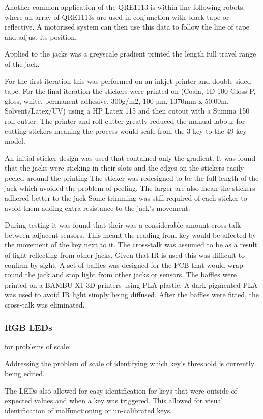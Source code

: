 Another common application of the QRE1113 is within line following
robots, where an array of QRE1113s are used in conjunction with black
tape or reflective. A motorised system can then use this data to follow the line of tape and adjust its position.

Applied to the jacks was a greyscale gradient printed the length full
travel range of the jack.

For the first iteration this was performed on an inkjet printer and
double-sided tape. For the final iteration the stickers were printed on
(Coala, 1D 100 Gloss P, gloss, white, permanent adhesive, 300g/m2, 100
µm, 1370mm x 50.00m, Solvent/Latex/UV) using a HP Latex 115 and then
cutout with a Summa 150 roll cutter. The printer and roll cutter greatly
reduced the manual labour for cutting stickers meaning the process would
scale from the 3-key to the 49-key model.

An initial sticker design was used that contained only the gradient. It
was found that the jacks were sticking in their slots and the edges on the
stickers easily peeled around the printing The sticker was redesigned to
be the full length of the jack which avoided the problem of peeling. The
larger are also mean the stickers adhered better to the jack Some
trimming was still required of each sticker to avoid them adding extra
resistance to the jack's movement.

During testing it was found that their was a considerable amount
cross-talk between adjacent sensors. This meant the reading from key
would be affected by the movement of the key next to it. The cross-talk
was assumed to be as a result of light reflecting from other jacks.
Given that IR is used this was difficult to confirm by sight. A set of
baffles was designed for the PCB that would wrap round the jack and stop
light from other jacks or sensors. The baffles were printed on a BAMBU X1 3D
printers using PLA plastic. A dark pigmented PLA was used to avoid IR
light simply being diffused. After the baffles were fitted, the
cross-talk was eliminated.


\subsubsection{RGB LEDs}\label{rgb-leds}

for problems of scale:

Addressing the problem of scale of identifying which key's threshold is
currently being edited.

The LEDs also allowed for easy identification for keys that were outside
of expected values and when a key was triggered. This allowed for visual
identification of malfunctioning or un-calibrated keys.

